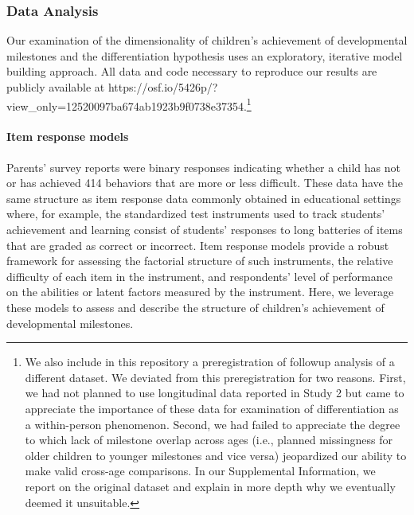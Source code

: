 \documentclass[man, floatsintext]{apa7}
\begin{document}
\subsubsection{Data Analysis}

Our examination of the dimensionality of children's achievement of developmental milestones  and the differentiation hypothesis uses an exploratory, iterative model building approach. All data and code necessary to reproduce our results are publicly available at https://osf.io/5426p/?view_only=12520097ba674ab1923b9f0738e37354.\footnote{We also include in this repository a preregistration of followup analysis of a different dataset. We deviated from this preregistration for two reasons. First, we had not planned to use longitudinal data reported in Study 2 but came to appreciate the importance of these data for examination of differentiation as a within-person phenomenon. Second, we had failed to appreciate the degree to which lack of milestone
overlap across ages (i.e., planned missingness for older children to
younger milestones and vice versa) jeopardized our ability to make valid cross-age
comparisons. In our Supplemental Information, we report on the original dataset and explain in more depth why we eventually deemed it unsuitable.}

\paragraph{Item response models}

Parents' survey reports were binary responses indicating whether a child has not or has achieved 414 behaviors that are more or less difficult. These data have the same structure as item response data commonly obtained in educational settings where, for example, the standardized test instruments used to track students' achievement and learning consist of students' responses to long batteries of items that are graded as correct or incorrect. Item response models provide a robust framework for assessing the factorial structure of such instruments, the relative difficulty of each item in the instrument, and respondents' level of performance on the abilities or latent factors measured by the instrument. Here, we leverage these models to assess and describe the structure of children's achievement of developmental milestones. 
\end{document}
